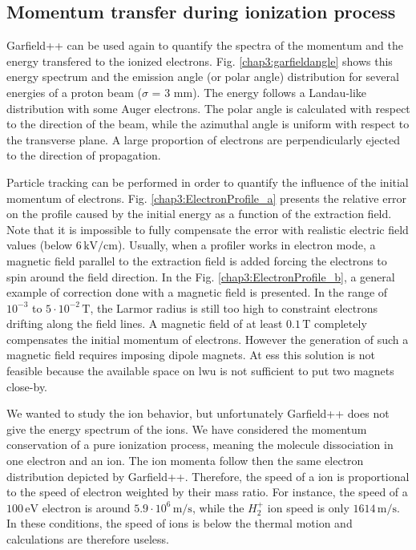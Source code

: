 \begin{refsection}
  \subsection{Momentum transfer during ionization process}
  \label{chap3:section:momentum}
  Garfield++ can be used again to quantify the spectra of the momentum and the energy transfered to the ionized electrons. Fig. \ref{chap3:garfieldangle} shows this energy spectrum and the emission angle (or polar angle) distribution for several energies of a proton beam ($\sigma$ = 3 mm). The energy follows a Landau-like distribution with some Auger electrons. The polar angle is calculated with respect to the direction of the beam, while the azimuthal angle is uniform with respect to the transverse plane. A large proportion of electrons are perpendicularly ejected to the direction of propagation.
  

  Particle tracking can be performed in order to quantify the influence of the initial momentum of electrons. Fig. \ref{chap3:ElectronProfile_a} presents the relative error on the profile caused by the initial energy as a function of the extraction field. Note that it is impossible to fully compensate the error with realistic electric field values (below $6\,\mathrm{kV/cm}$). Usually, when a profiler works in electron mode, a magnetic field parallel to the extraction field is added forcing the electrons to spin around the field direction. In the Fig. \ref{chap3:ElectronProfile_b}, a general example of correction done with a magnetic field is presented. In the range of $10^{-3}$ to $5\cdot10^{-2}\,\mathrm{T}$, the Larmor radius is still too high to constraint electrons drifting along the field lines.
  A magnetic field of at least $0.1\,\mathrm{T}$ completely compensates the initial momentum of electrons. However the generation of such a magnetic field requires imposing dipole magnets. At \acrshort{ess} this solution is not feasible because the available space on \acrshort{lwu} is not sufficient to put two magnets close-by.
  

  We wanted to study the ion behavior, but unfortunately Garfield++ does not give the energy spectrum of the ions.
  We have considered the momentum conservation of a pure ionization process, meaning the molecule dissociation in one electron and an ion. The ion momenta follow then the same electron distribution depicted by Garfield++. Therefore, the speed of a ion is proportional to the speed of electron weighted by their mass ratio. For instance, the speed of a $100\,\mathrm{eV}$ electron is around $5.9\cdot10^{6}\,\mathrm{m/s}$, while the $H_{2}^{+}$ ion speed is only $1614\,\mathrm{m/s}$. In these conditions, the speed of ions is below the thermal motion and calculations are therefore useless.



\end{refsection}

